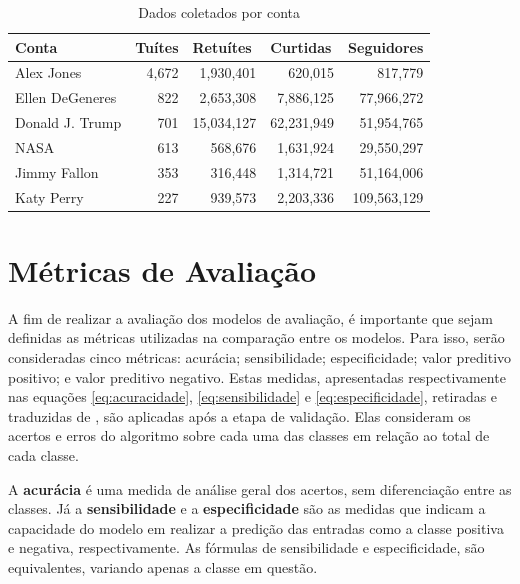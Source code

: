 \documentclass[oneside,openright,12pt]{ufsm_2015} %
\begin{document}
    \begin{table}[ht]
    \centering
    \caption{Dados coletados por conta}
    \label{tab:contas-tweets}
    \begin{tabular}{|l|r|r|r|r|}
    \hline
    \textbf{Conta}  & \multicolumn{1}{l|}{\textbf{Tuítes}} & \multicolumn{1}{l|}{\textbf{Retuítes}} & \multicolumn{1}{l|}{\textbf{Curtidas}} & \multicolumn{1}{l|}{\textbf{Seguidores}} \\ \hline
    Alex Jones      & 4,672  & 1,930,401  & 620,015     & 817,779     \\ \hline
    Ellen DeGeneres & 822    & 2,653,308  & 7,886,125   & 77,966,272  \\ \hline
    Donald J. Trump & 701    & 15,034,127 & 62,231,949  & 51,954,765  \\ \hline
    NASA            & 613    & 568,676    & 1,631,924   & 29,550,297  \\ \hline
    Jimmy Fallon    & 353    & 316,448    & 1,314,721   & 51,164,006  \\ \hline
    Katy Perry      & 227    & 939,573    & 2,203,336   & 109,563,129 \\ \hline
    \end{tabular}
    \end{table}
    

\section{Métricas de Avaliação}
\label{sec:exp-class-metricas}

    \par A fim de realizar a avaliação dos modelos de avaliação, é importante que sejam definidas as métricas utilizadas na comparação entre os modelos. Para isso, serão consideradas cinco métricas: acurácia; sensibilidade; especificidade; valor preditivo positivo; e valor preditivo negativo. Estas medidas, apresentadas respectivamente nas equações \ref{eq:acuracidade}, \ref{eq:sensibilidade} e \ref{eq:especificidade}, retiradas e traduzidas de \cite{book:han:11}, são aplicadas após a etapa de validação. Elas consideram os acertos e erros do algoritmo sobre cada uma das classes em relação ao total de cada classe.
    
    \par A \textbf{acurácia} é uma medida de análise geral dos acertos, sem diferenciação entre as classes. Já a \textbf{sensibilidade} e a \textbf{especificidade} são as medidas que indicam a capacidade do modelo em realizar a predição das entradas como a classe positiva e negativa, respectivamente. As fórmulas de sensibilidade e especificidade, são equivalentes, variando apenas a classe em questão.
    
\end{document}
